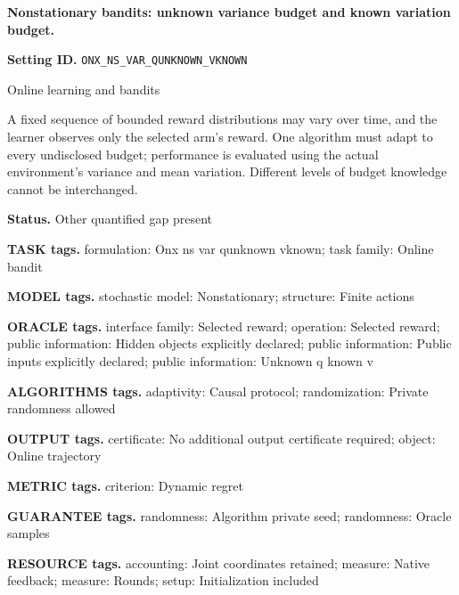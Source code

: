 \documentclass[10pt,a4paper]{article}
\begin{document}
\raggedright

{\LARGE\bfseries\sffamily\color{AtlasNavy} Nonstationary bandits: unknown variance budget and known variation budget.\par}\vspace{5pt}


\textbf{Setting ID.} \texttt{ONX\_\allowbreak{}NS\_\allowbreak{}VAR\_\allowbreak{}QUNKNOWN\_\allowbreak{}VKNOWN}



Online learning and bandits



A fixed sequence of bounded reward distributions may vary over time, and the learner observes only the selected arm's reward. One algorithm must adapt to every undisclosed budget; performance is evaluated using the actual environment's variance and mean variation. Different levels of budget knowledge cannot be interchanged.



\textbf{Status.} Other quantified gap present



\textbf{TASK tags.} formulation: Onx ns var qunknown vknown; task family: Online bandit



\textbf{MODEL tags.} stochastic model: Nonstationary; structure: Finite actions



\textbf{ORACLE tags.} interface family: Selected reward; operation: Selected reward; public information: Hidden objects explicitly declared; public information: Public inputs explicitly declared; public information: Unknown q known v



\textbf{ALGORITHMS tags.} adaptivity: Causal protocol; randomization: Private randomness allowed



\textbf{OUTPUT tags.} certificate: No additional output certificate required; object: Online trajectory



\textbf{METRIC tags.} criterion: Dynamic regret



\textbf{GUARANTEE tags.} randomness: Algorithm private seed; randomness: Oracle samples



\textbf{RESOURCE tags.} accounting: Joint coordinates retained; measure: Native feedback; measure: Rounds; setup: Initialization included
\end{document}
